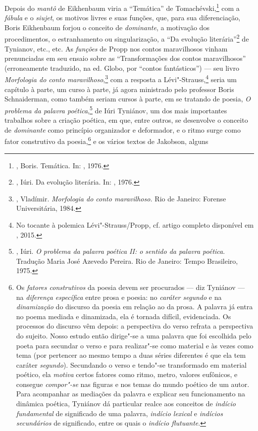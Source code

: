 Depois do \emph{mantô} de Eikhenbaum viria a ``Temática'' de
Tomachévski,\footnote{, Boris. Temática. In:
 , 1976.} com a \emph{fábula} e o \emph{siujet}, os motivos livres e
suas funções, que, para sua diferenciação, Boris Eikhenbaum forjou o conceito
de \emph{dominante}, a motivação dos procedimentos, o estranhamento ou
singularização, a ``Da evolução literária''\footnote{, Iúri. Da evolução literária.
 In: , 1976.} de Tynianov, etc., etc. As
\emph{funções} de Propp nos contos maravilhosos vinham prenunciadas
em seu ensaio sobre as ``Transformações dos contos maravilhosos''
(erroneamente traduzido, na ed. Globo, por ``contos fantásticos'') --- seu livro
\emph{Morfologia do conto maravilhoso},\footnote{, 
Vladímir. \emph{Morfologia do conto maravilhoso.} Rio de Janeiro:
 Forense Universitária, 1984.} com a resposta a
Lévi"-Strauss,\footnote{No tocante à polemica Lévi"-Strauss/Propp,
 cf. artigo completo disponível em , 2015.} seria um capítulo à parte, um curso à
parte, já agora ministrado pelo professor Boris Schnaiderman, como também seriam cursos
à parte, em se tratando de poesia, \emph{O problema da palavra poética},\footnote{, Iúri. 
\emph{O problema da palavra poética II: o sentido da palavra poética}.
 Tradução Maria José Azevedo Pereira. Rio de Janeiro: Tempo Brasileiro,
 1975.}
de Iúri Tyniánov, um dos mais importantes trabalhos sobre a
criação poética, em que, entre outros, se desenvolve o conceito de
\emph{dominante} como princípio organizador e deformador, e o ritmo surge como
fator construtivo da poesia,\footnote{Os \emph{fatores 
construtivos} da poesia devem ser procurados --- diz Tyniánov --- na 
\emph{diferença específica} entre prosa e poesia: no \emph{caráter 
segundo} e na \emph{dinamização} do discurso da poesia em relação ao 
da prosa. A palavra já entra no poema mediada e dinamizada, ela é 
tornada difícil, evidenciada. Os processos do discurso vêm depois:
 a perspectiva do verso refrata a perspectiva do sujeito. Nosso estudo 
então dirige"-se a uma palavra que foi escolhida pelo poeta para 
secundar o verso e para realizar"-se como material e às vezes como
 tema (por pertencer ao mesmo tempo a duas séries diferentes é que
 ela tem caráter \emph{segundo}). Secundando o verso e tendo"-se
transformado em material poético, ela \emph{motiva} certos fatores 
como ritmo, metro, valores eufônicos, e consegue \emph{compor"-se} 
nas figuras e nos temas do mundo poético de um autor. Para acompanhar
 as mediações da palavra e explicar seu funcionamento na dinâmica
 poética, Tyniánov dá particular realce aos conceitos de \emph{indício
 fundamental} de significado de uma palavra, \emph{indício lexical}
 e \emph{indícios secundários} de significado, entre os quais o
 \emph{indício flutuante}.} e os vários textos de Jakobson, alguns
